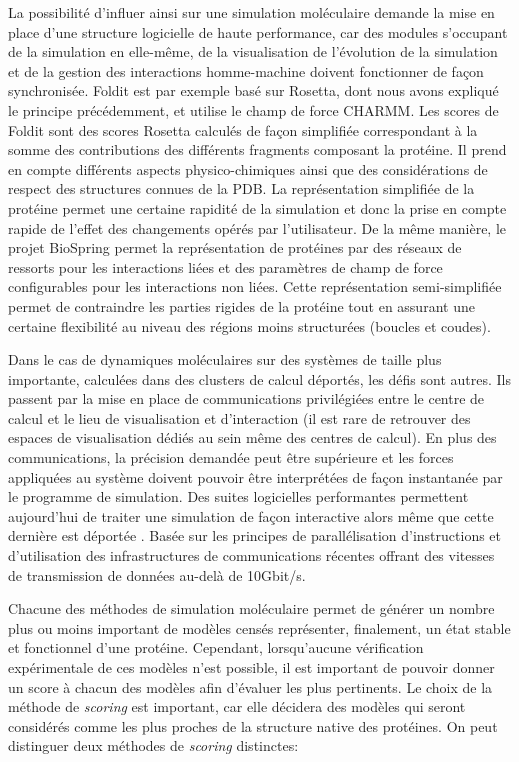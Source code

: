 La possibilité d'influer ainsi sur une simulation moléculaire demande la mise en place d'une structure logicielle de haute performance, car des modules s'occupant de la simulation en elle-même, de la visualisation de l'évolution de la simulation et de la gestion des interactions homme-machine doivent fonctionner de façon synchronisée. Foldit est par exemple basé sur Rosetta, dont nous avons expliqué le principe précédemment, et utilise le champ de force CHARMM. Les scores de Foldit sont des scores Rosetta calculés de façon simplifiée correspondant à la somme des contributions des différents fragments composant la protéine. Il prend en compte différents aspects physico-chimiques ainsi que des considérations de respect des structures connues de la PDB.
La représentation simplifiée de la protéine permet une certaine rapidité de la simulation et donc la prise en compte rapide de l'effet des changements opérés par l'utilisateur. De la même manière, le projet BioSpring permet la représentation de protéines par des réseaux de ressorts pour les interactions liées et des paramètres de champ de force configurables pour les interactions non liées. Cette représentation semi-simplifiée permet de contraindre les parties rigides de la protéine tout en assurant une certaine flexibilité au niveau des régions moins structurées (boucles et coudes).

Dans le cas de dynamiques moléculaires sur des systèmes de taille plus importante, calculées dans des clusters de calcul déportés, les défis sont autres. Ils passent par la mise en place de communications privilégiées entre le centre de calcul et le lieu de visualisation et d'interaction (il est rare de retrouver des espaces de visualisation dédiés au sein même des centres de calcul). En plus des communications, la précision demandée peut être supérieure et les forces appliquées au système doivent pouvoir être interprétées de façon instantanée par le programme de simulation. Des suites logicielles performantes permettent aujourd'hui de traiter une simulation de façon interactive alors même que cette dernière est déportée \cite{dreher2014exaviz}. Basée sur les principes de parallélisation d'instructions et d'utilisation des infrastructures de communications récentes offrant des vitesses de transmission de données au-delà de 10Gbit/s.

 \label{simu_eval}

Chacune des méthodes de simulation moléculaire permet de générer un nombre plus ou moins important de modèles censés représenter, finalement, un état stable et fonctionnel d'une protéine. Cependant, lorsqu'aucune vérification expérimentale de ces modèles n'est possible, il est important de pouvoir donner un score à chacun des modèles afin d'évaluer les plus pertinents. Le choix de la méthode de \textit{scoring} est important, car elle décidera des modèles qui seront considérés comme les plus proches de la structure native des protéines. On peut distinguer deux méthodes de \textit{scoring} distinctes:


